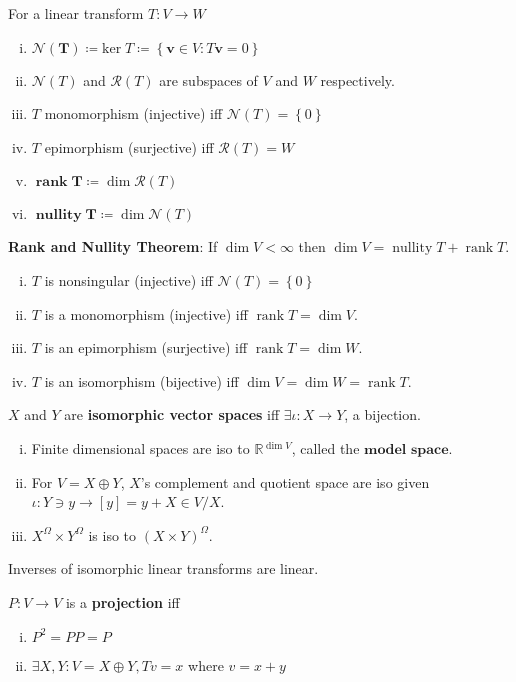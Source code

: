 \documentclass[letterpaper,11pt]{amsart}
\newcommand{\reals}{\mathbb{R}}
\newcommand{\keyphrase}[1]{\textbf{#1}}
\DeclareMathOperator{\nullity}{nullity}
\DeclareMathOperator{\rank}{rank}
\begin{document}
For a linear transform $T:V\to{}W$
\begin{enumerate}[(i)]
    \item $\boldsymbol{\mathcal{N}(T)} \coloneqq
        \mathrm{ker}\;T\coloneqq\left\{\mathbf{v}\in{}V:T\mathbf{v}=0\right\}$
    \item $\mathcal{N}(T)$ and $\mathcal{R}(T)$ are subspaces of
        $V$ and $W$ respectively.
    \item $T$ monomorphism (injective)
        iff $\mathcal{N}\left(T\right)=\left\{0\right\}$
    \item $T$ epimorphism (surjective)
        iff $\mathcal{R}\left(T\right)=W$
    \item $\boldsymbol{\rank T} \coloneqq \dim \mathcal{R}(T)$
    \item $\boldsymbol{\nullity T} \coloneqq \dim \mathcal{N}(T)$
\end{enumerate}
\keyphrase{Rank and Nullity Theorem}:
If $\dim V < \infty$ then $\dim V = \nullity T + \rank T$.
\begin{enumerate}[(i)]
    \item $T$ is nonsingular (injective) iff $\mathcal{N}(T)=\left\{0\right\}$
    \item $T$ is a monomorphism (injective) iff $\rank T = \dim V$.
    \item $T$ is an epimorphism (surjective) iff $\rank T = \dim W$.
    \item $T$ is an isomorphism (bijective) iff $\dim V = \dim W = \rank T$.
\end{enumerate}

$X$ and $Y$ are \keyphrase{isomorphic vector spaces} iff
$\exists \iota : X \to Y$, a bijection.
\begin{enumerate}[(i)]
    \item Finite dimensional spaces are iso to $\reals{}^{\dim V}$,
          called the $\keyphrase{model space}$.
    \item For $V=X\oplus{}Y$, $X$'s complement and quotient space are
            iso given
            $\iota : Y \ni y \to \left[ y \right] = y+X \in V/X$.
    \item $X^\Omega \times Y^\Omega$ is iso to
        $\left( X \times Y \right)^{\Omega}$.
\end{enumerate}

Inverses of isomorphic linear transforms are linear.

$P:V \to V$ is a \keyphrase{projection} iff
\begin{enumerate}[(i)]
    \item $P^2 = P P = P$
    \item $\exists{} X,Y : V = X \oplus Y, Tv=x$ where $v=x+y$
\end{enumerate}
\end{document}
